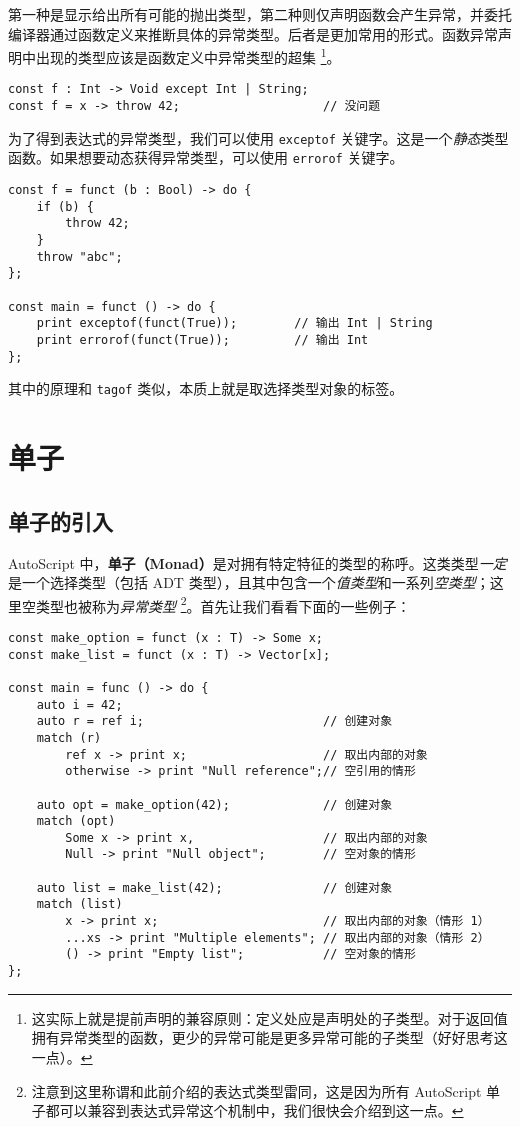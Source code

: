 第一种是显示给出所有可能的抛出类型，第二种则仅声明函数会产生异常，并委托编译器通过函数定义来推断具体的异常类型。后者是更加常用的形式。函数异常声明中出现的类型应该是函数定义中异常类型的超集 \footnote{这实际上就是提前声明的兼容原则：定义处应是声明处的子类型。对于返回值拥有异常类型的函数，更少的异常可能是更多异常可能的子类型（好好思考这一点）。}。

\begin{lstlisting}
const f : Int -> Void except Int | String;
const f = x -> throw 42;					// 没问题
\end{lstlisting}

为了得到表达式的异常类型，我们可以使用 \lstinline!exceptof! 关键字。这是一个\emph{静态}类型函数。如果想要动态获得异常类型，可以使用 \lstinline!errorof! 关键字。

\begin{minipage}[c]{0.95\textwidth}
\vspace{1.0em}
\begin{lstlisting}
const f = funct (b : Bool) -> do {
    if (b) {
        throw 42;
    }
    throw "abc";
};

const main = funct () -> do {
    print exceptof(funct(True));		// 输出 Int | String
    print errorof(funct(True));			// 输出 Int
};
\end{lstlisting}
\end{minipage}

其中的原理和 \lstinline!tagof! 类似，本质上就是取选择类型对象的标签。

\section{单子}

\subsection{单子的引入}

AutoScript 中，\textbf{单子（Monad）}是对拥有特定特征的类型的称呼。这类类型\emph{一定}是一个选择类型（包括 ADT 类型），且其中包含一个\emph{值类型}和一系列\emph{空类型}；这里空类型也被称为\emph{异常类型} \footnote{注意到这里称谓和此前介绍的表达式类型雷同，这是因为所有 AutoScript 单子都可以兼容到表达式异常这个机制中，我们很快会介绍到这一点。}。首先让我们看看下面的一些例子：

\begin{lstlisting}
const make_option = funct (x : T) -> Some x;
const make_list = funct (x : T) -> Vector[x];

const main = func () -> do {
    auto i = 42;
    auto r = ref i;							// 创建对象
    match (r)
        ref x -> print x;					// 取出内部的对象
        otherwise -> print "Null reference";// 空引用的情形

	auto opt = make_option(42);				// 创建对象
	match (opt)
		Some x -> print x,					// 取出内部的对象
		Null -> print "Null object";		// 空对象的情形
	
	auto list = make_list(42);				// 创建对象
	match (list)
	    x -> print x;						// 取出内部的对象（情形 1）
	    ...xs -> print "Multiple elements"; // 取出内部的对象（情形 2）
	    () -> print "Empty list";			// 空对象的情形
};
\end{lstlisting}


